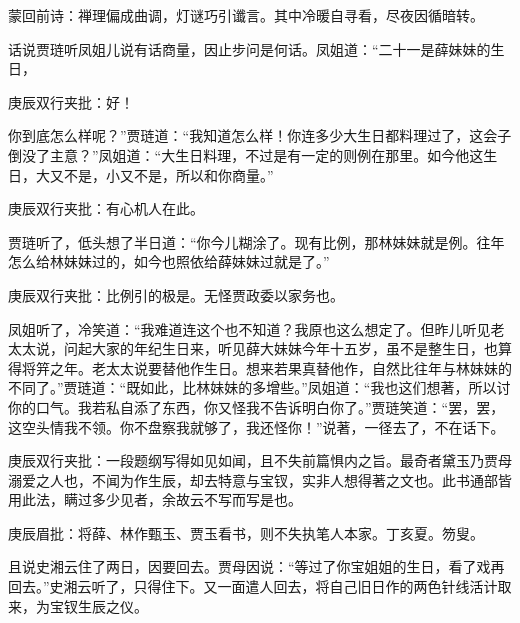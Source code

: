 
\begin{parag}

    \begin{note}蒙回前诗：禅理偏成曲调，灯谜巧引谶言。其中冷暖自寻看，尽夜因循暗转。\end{note}
\end{parag}


\begin{parag}


    话说贾琏听凤姐儿说有话商量，因止步问是何话。凤姐道：“二十一是薛妹妹的生日，\begin{note}庚辰双行夹批：好！\end{note}你到底怎么样呢？”贾琏道：“我知道怎么样！你连多少大生日都料理过了，这会子倒没了主意？”凤姐道：“大生日料理，不过是有一定的则例在那里。如今他这生日，大又不是，小又不是，所以和你商量。”\begin{note}庚辰双行夹批：有心机人在此。\end{note}贾琏听了，低头想了半日道：“你今儿糊涂了。现有比例，那林妹妹就是例。往年怎么给林妹妹过的，如今也照依给薛妹妹过就是了。”\begin{note}庚辰双行夹批：比例引的极是。无怪贾政委以家务也。\end{note}凤姐听了，冷笑道：“我难道连这个也不知道？我原也这么想定了。但昨儿听见老太太说，问起大家的年纪生日来，听见薛大妹妹今年十五岁，虽不是整生日，也算得将笄之年。老太太说要替他作生日。想来若果真替他作，自然比往年与林妹妹的不同了。”贾琏道：“既如此，比林妹妹的多增些。”凤姐道：“我也这们想著，所以讨你的口气。我若私自添了东西，你又怪我不告诉明白你了。”贾琏笑道：“罢，罢，这空头情我不领。你不盘察我就够了，我还怪你！”说著，一径去了，不在话下。\begin{note}庚辰双行夹批：一段题纲写得如见如闻，且不失前篇惧内之旨。最奇者黛玉乃贾母溺爱之人也，不闻为作生辰，却去特意与宝钗，实非人想得著之文也。此书通部皆用此法，瞒过多少见者，余故云不写而写是也。\end{note}\begin{note}庚辰眉批：将薛、林作甄玉、贾玉看书，则不失执笔人本家。丁亥夏。笏叟。\end{note}
\end{parag}


\begin{parag}


    且说史湘云住了两日，因要回去。贾母因说：“等过了你宝姐姐的生日，看了戏再回去。”史湘云听了，只得住下。又一面遣人回去，将自己旧日作的两色针线活计取来，为宝钗生辰之仪。
\end{parag}


